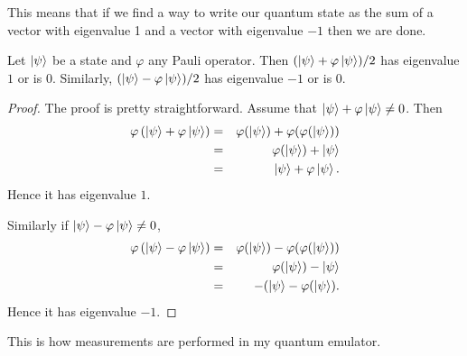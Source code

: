 \documentclass{article}
\begin{document}
This means that if we find a way to write our quantum state as the sum of
a vector with eigenvalue 1 and a vector with eigenvalue $-1$ then we are 
done.

\begin{lemma}
  Let $\ket{\psi}$ be a state and $\varphi$ any Pauli operator. Then
  $(\ket\psi+\varphi\ket\psi)/2$ has eigenvalue $1$ or is $0$. Similarly,
  $(\ket\psi-\varphi\ket\psi)/2$ has eigenvalue $-1$ or is $0$.
  \begin{proof}
    The proof is pretty straightforward. Assume that $\ket\psi+\varphi\ket\psi\ne0$.
    Then
    \begin{eqnarray*}
      \varphi\left(\ket\psi+\varphi\ket\psi\right) 
      &=&\varphi(\ket\psi)+\varphi(\varphi(\ket\psi)) \\
      &=&\varphi(\ket\psi)+\ket\psi \\
      &=&\ket\psi+\varphi\ket\psi.
    \end{eqnarray*}
    Hence it has eigenvalue $1$.
    
    Similarly if $\ket\psi-\varphi\ket\psi\ne0$,
    \begin{eqnarray*}
      \varphi\left(\ket\psi-\varphi\ket\psi\right) 
      &=&\varphi(\ket\psi)-\varphi(\varphi(\ket\psi)) \\
      &=&\varphi(\ket\psi)-\ket\psi \\
      &=&-(\ket\psi-\varphi(\ket\psi).
    \end{eqnarray*}
    Hence it has eigenvalue $-1$.
  \end{proof}
\end{lemma}

This is how measurements are performed in my quantum emulator.

\end{document}
